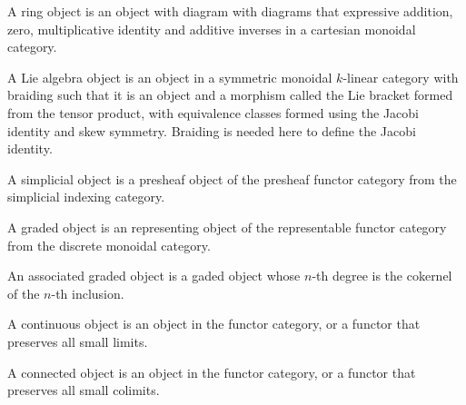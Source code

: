 \begin{definition}
    \label{definition-ring-object}
    A ring object is an object with diagram with diagrams that expressive addition, zero, multiplicative identity and additive inverses in a cartesian monoidal category.
\end{definition}

\begin{definition}
    \label{definition-lie-algebra-object}
    A Lie algebra object is an object in a symmetric monoidal $k$-linear category with braiding such that it is an object and a morphism called the Lie bracket formed from the tensor product, with equivalence classes formed using the Jacobi identity and skew symmetry. Braiding is needed here to define the Jacobi identity.
\end{definition}

\begin{definition}
    \label{definition-simplicial-object}
    A simplicial object is a presheaf object of the presheaf functor category from the simplicial indexing category.
\end{definition}

\begin{definition}
    \label{definition-graded-object-functor}
    A graded object is an representing object of the representable functor category from the discrete monoidal category.
\end{definition}

\begin{definition}
    \label{definition-associated-graded-object-functor}
    An associated graded object is a gaded object whose $n$-th degree is the cokernel of the $n$-th inclusion.
\end{definition}

\begin{definition}
    \label{definition-continuous-object}
    A continuous object is an object in the functor category, or a functor that preserves all small limits.
\end{definition}

\begin{definition}
    \label{definition-connected-object-functor}
    A connected object is an object in the functor category, or a functor that preserves all small colimits.
\end{definition}

